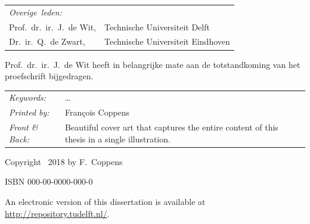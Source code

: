 \begin{titlepage}
\begin{tabular}{p{3cm}l}
    \medskip
    \mbox{\emph{Overige leden:}} & \\
    Prof.\ dr.\ ir.\ J.\ de Wit, & Technische Universiteit Delft \\
    Dr.\ ir.\ Q.\ de Zwart, & Technische Universiteit Eindhoven \\
\end{tabular}

\medskip
\noindent Prof.\ dr.\ ir.\ J.\ de Wit heeft in belangrijke mate aan de totstandkoming van het proefschrift bijgedragen.

\vfill
\vfill

\noindent
\begin{tabular}{@{}p{}@{}p{}}
    \textit{Keywords:} & \ldots \\[\medskipamount]
    \textit{Printed by:} & Fran\c{c}ois Coppens \\[\medskipamount]
    \textit{Front \& Back:} & Beautiful cover art that captures the entire content of this thesis in a single illustration.
\end{tabular}

\vspace{4\bigskipamount}

\noindent Copyright \textcopyright\ 2018 by F.~Coppens


\medskip
\noindent ISBN 000-00-0000-000-0

\medskip
\noindent An electronic version of this dissertation is available at \\
\url{http://repository.tudelft.nl/}.

\end{titlepage}